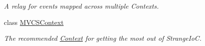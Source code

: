 \begin{DoxyCompactItemize}
\begin{DoxyCompactList}\small\item\em A relay for events mapped across multiple Contexts. \end{DoxyCompactList}\item 
class \hyperlink{classstrange_1_1extensions_1_1context_1_1impl_1_1_m_v_c_s_context}{M\-V\-C\-S\-Context}
\begin{DoxyCompactList}\small\item\em The recommended \hyperlink{classstrange_1_1extensions_1_1context_1_1impl_1_1_context}{Context} for getting the most out of Strange\-Io\-C. \end{DoxyCompactList}\end{DoxyCompactItemize}
